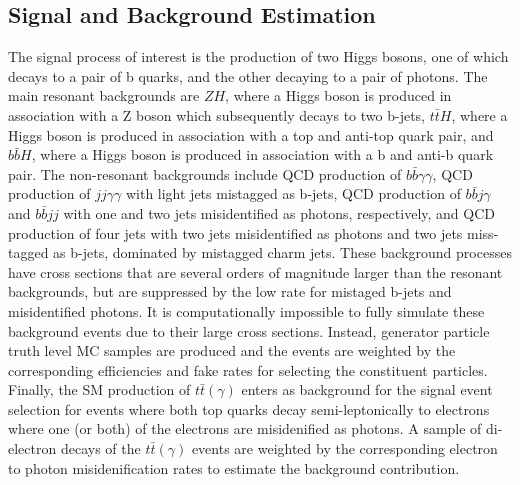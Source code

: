 \subsection{Signal and Background Estimation}
\label{sec:bkgestimation}
The signal process of interest is the production of two Higgs bosons, one of which decays to a pair of b quarks, and the other decaying to a pair of photons. The main resonant backgrounds are $ZH$, where a Higgs boson is produced in association with a Z boson which subsequently decays to two b-jets, $t\bar{t}H$, where a Higgs boson is produced in association with a top and anti-top quark pair, and $b\bar{b}H$, where a Higgs boson is produced in association with a b and anti-b quark pair. The non-resonant backgrounds include QCD production  of $b \bar{b} \gamma\gamma$, QCD production of $jj \gamma\gamma$ with light jets mistagged  as b-jets, QCD production of $b \bar{b} j \gamma$ and $b \bar{b} jj$ with one and two jets misidentified as photons, respectively, and QCD production of four jets with two jets misidentified  as photons and two jets miss-tagged as b-jets, dominated by mistagged charm jets. 
These background processes have cross sections that are several orders of magnitude larger than the resonant backgrounds, but are suppressed
by the low rate for mistaged b-jets and misidentified photons.  It is computationally impossible to fully simulate these background events due to their large cross sections. Instead, generator particle truth level MC samples are produced and the events are weighted by the corresponding efficiencies and fake rates for selecting the constituent particles. Finally, the SM  production of $t\bar{t}(\gamma)$ enters as background for the signal event selection for events where both top quarks decay semi-leptonically to electrons where one (or both) of the electrons are misidenified as photons. A sample of di-electron decays of the $t\bar{t}(\gamma)$ events are weighted by the corresponding electron to photon misidenification rates to estimate the background contribution.


